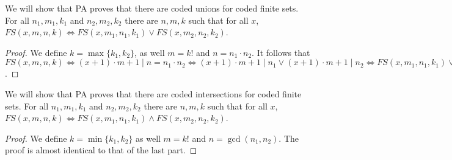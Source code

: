 \subquestion{}
We will show that PA proves that there are coded unions for coded finite sets.
For all $n_1, m_1, k_1$ and $n_2, m_2, k_2$ there are $n, m, k$ such that for all $x$, $FS(x, m, n, k) \iff FS(x, m_1, n_1, k_1) \lor FS(x, m_2, n_2, k_2)$.
\begin{proof}
	We define $k = \max\{k_1, k_2\}$, as well $m = k! $ and $n = n_1 \cdot n_2$.
	It follows that $FS(x, m, n, k) \iff (x + 1) \cdot m + 1 \mid n = n_1 \cdot n_2 \iff (x + 1) \cdot m + 1 \mid n_1 \lor (x + 1) \cdot m + 1 \mid n_2 \iff FS(x, m_1, n_1, k_1) \lor FS(x, m_2, n_2, k_2)$.
\end{proof}

\subquestion{}
We will show that PA proves that there are coded intersections for coded finite sets.
For all $n_1, m_1, k_1$ and $n_2, m_2, k_2$ there are $n, m, k$ such that for all $x$, $FS(x, m, n, k) \iff FS(x, m_1, n_1, k_1) \land FS(x, m_2, n_2, k_2)$.
\begin{proof}
	We define $k = \min\{k_1, k_2\}$ as well $m = k! $ and $n = \gcd(n_1, n_2)$.
	The proof is almost identical to that of the last part.
\end{proof}



